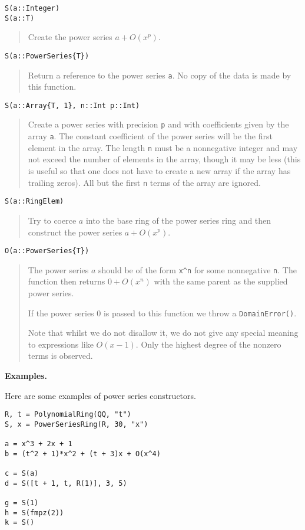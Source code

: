 \documentclass[a4paper,10pt]{article}
\newcommand{\code}{\lstinline}
\newcommand{\desc}[1]{\vspace{-3mm}\begin{quote}#1\end{quote}}
\begin{document}
\begin{lstlisting}
S(a::Integer)
S(a::T)
\end{lstlisting}

\desc{Create the power series $a + O(x^p)$.}

\begin{lstlisting}
S(a::PowerSeries{T})
\end{lstlisting}

\desc{Return a reference to the power series \code{a}. No copy of the data is
made by this function.}

\begin{lstlisting}
S(a::Array{T, 1}, n::Int p::Int)
\end{lstlisting}

\desc{Create a power series with precision \code{p} and with coefficients given
by the array \code{a}. The constant coefficient of the power series will be the
first element in the array. The length \code{n} must be a nonnegative integer
and may not exceed the number of elements in the array, though it may be less
(this is useful so that one does not have to create a new array if the array
has trailing zeros). All but the first \code{n} terms of the array are ignored.}

\begin{lstlisting}
S(a::RingElem)
\end{lstlisting}

\desc{Try to coerce $a$ into the base ring of the power series ring and then
construct the power series $a + O(x^p)$.}

\begin{lstlisting}
O(a::PowerSeries{T})
\end{lstlisting}

\desc{The power series $a$ should be of the form \code{x^n} for some nonnegative
\code{n}. The function then returns $0 + O(x^n)$ with the same parent as the
supplied power series.

If the power series $0$ is passed to this function we throw a \code{DomainError()}. 

Note that whilst we do not disallow it, we do not give any special meaning to
expressions like $O(x - 1)$. Only the highest degree of the nonzero terms is
observed.}

\textbf{Examples.}

Here are some examples of power series constructors.

\begin{lstlisting}
R, t = PolynomialRing(QQ, "t")
S, x = PowerSeriesRing(R, 30, "x")

a = x^3 + 2x + 1
b = (t^2 + 1)*x^2 + (t + 3)x + O(x^4)

c = S(a)
d = S([t + 1, t, R(1)], 3, 5)

g = S(1)
h = S(fmpz(2))
k = S()
\end{lstlisting}
\end{document}
